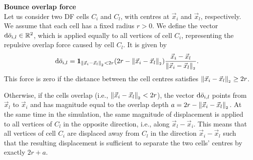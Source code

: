 \begin{definition}\textbf{Bounce overlap force} \\

	Let us consider two DF cells $C_i$ and $C_l$, with centres at $\vec{x}_i$ and $\vec{x}_l$, respectively. 
	We assume that each cell has a fixed radius $r > 0$.
	We define the vector $\mathrm{d} \bar{o}_{i,l} \in \mathbb{R}^2$, which is applied equally to all vertices of cell $C_i$, representing the repulsive overlap force caused by cell $C_l$. 
	It is given by
	\[
	\dequ \bar{o}_{i,l} = \mathbf{1}_{\norm[\vec{x}_i - \vec{x}_l] < 2r} (2r - \norm[\vec{x}_i - \vec{x}_l]) \dfrac{\vec{x}_i - \vec{x}_l}{\norm[\vec{x}_i - \vec{x}_l]}.
	\]
	This force is zero if the distance between the cell centres satisfies $\norm[\vec{x}_i - \vec{x}_l] \geq 2r$.

	Otherwise, if the cells overlap (i.e., $\norm[\vec{x}_i - \vec{x}_l] < 2r$), the vector $\mathrm{d} \bar{o}_{i,l}$ points from $\vec{x}_l$ to $\vec{x}_i$ and has magnitude equal to the overlap depth $a = 2r - \norm[\vec{x}_i - \vec{x}_l]$. 
	At the same time in the simulation, the same magnitude of displacement is applied to all vertices of $C_l$ in the opposite direction, i.e., along $\vec{x}_l - \vec{x}_i$.
	This means that all vertices of cell $C_i$ are displaced away from $C_l$ in the direction $\vec{x}_i - \vec{x}_l$ such that the resulting displacement is sufficient to separate the two cells' centres by exactly $2r + a$. 


\end{definition}
